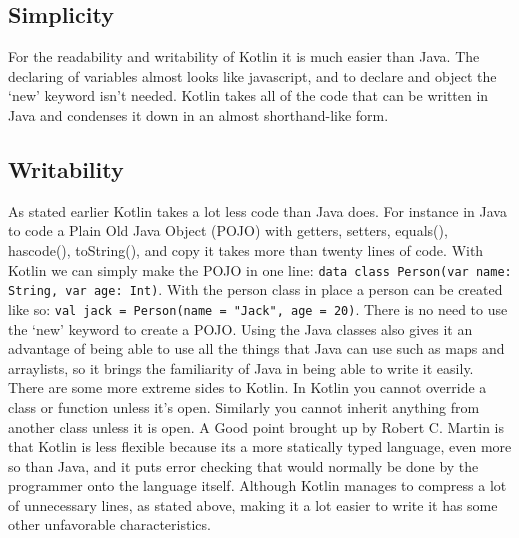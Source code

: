 \begin{center}
\section{Simplicity}
\end{center}
\hspace{1em}For the readability and writability of Kotlin it is much easier than Java. The declaring of variables almost looks like javascript, and to declare and object the `new' keyword isn't needed. Kotlin takes all of the code that can be written in Java and condenses it down in an almost shorthand-like form.

\subsection{Writability}
\hspace{1em}As stated earlier Kotlin takes a lot less code than Java does. For instance in Java to code a Plain Old Java Object (POJO) with getters, setters, equals(), hascode(), toString(), and copy it takes more than twenty lines of code. With Kotlin we can simply make the POJO in one line: \texttt{data class Person(var name: String, var age: Int)}. With the person class in place a person can be created like so: \texttt{val jack = Person(name = "Jack", age = 20)}. There is no need to use the `new' keyword to create a POJO. Using the Java classes also gives it an advantage of being able to use all the things that Java can use such as maps and arraylists, so it brings the familiarity of Java in being able to write it easily. There are some more extreme sides to Kotlin. In Kotlin you cannot override a class or function unless it's open. Similarly you cannot inherit anything from another class unless it is open. A Good point brought up by Robert C. Martin is that Kotlin is less flexible because its a more statically typed language, even more so than Java, and it puts error checking that would normally be done by the programmer onto the language itself. Although Kotlin manages to compress a lot of unnecessary lines, as stated above, making it a lot easier to write it has some other unfavorable characteristics.

